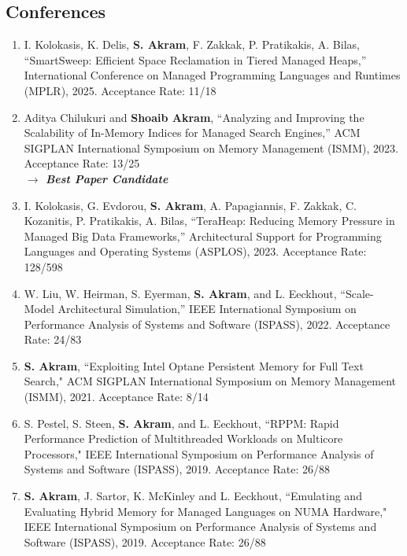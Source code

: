 \documentclass[singlecolumn,singlespace,11pt]{article}
\begin{document}
\subsection*{Conferences}
\begin{enumerate}

\item 
I. Kolokasis, K. Delis, \textbf{S. Akram}, F. Zakkak, P. Pratikakis, A. Bilas, ``SmartSweep: Efficient Space Reclamation in Tiered Managed Heaps,'' International Conference on Managed Programming Languages and Runtimes (MPLR), 2025. {\color{blue} Acceptance Rate: 11/18}


\item
Aditya Chilukuri and \textbf{Shoaib Akram}, ``Analyzing and Improving the Scalability of In-Memory Indices for Managed Search Engines,'' ACM SIGPLAN International Symposium on Memory Management (ISMM), 2023. {\color{blue} Acceptance Rate: 13/25}
\\
{\color{BrickRed} \textbf{$\longrightarrow$ \emph{Best Paper Candidate}}}

\item 
I. Kolokasis, G. Evdorou, \textbf{S. Akram}, A. Papagiannis, F. Zakkak, C. Kozanitis, P. Pratikakis, A. Bilas, ``TeraHeap: Reducing Memory Pressure in Managed Big Data Frameworks,'' Architectural Support for Programming Languages and Operating Systems (ASPLOS), 2023. {\color{blue} Acceptance Rate: 128/598}

\item
W. Liu, W. Heirman, S. Eyerman, \textbf{S. Akram}, and L. Eeckhout,
``Scale-Model Architectural Simulation,'' IEEE International Symposium on
Performance Analysis of Systems and Software (ISPASS), 2022. {\color{blue} Acceptance Rate: 24/83}

\item
\textbf{S. Akram}, ``Exploiting Intel Optane Persistent Memory for Full Text Search," ACM SIGPLAN International Symposium on Memory Management (ISMM), 2021. {\color{blue} Acceptance Rate: 8/14}

\item
S. Pestel, S. Steen, \textbf{S. Akram}, and L. Eeckhout, ``RPPM: Rapid Performance Prediction of Multithreaded Workloads on Multicore Processors," IEEE International Symposium on Performance Analysis of Systems and Software (ISPASS), 2019. {\color{blue} Acceptance Rate: 26/88}

\item
\textbf{S. Akram}, J. Sartor, K. McKinley and L. Eeckhout, ``Emulating and Evaluating Hybrid Memory for Managed Languages on NUMA Hardware," IEEE International Symposium on Performance Analysis of Systems and Software (ISPASS), 2019. {\color{blue} Acceptance Rate: 26/88}


\end{enumerate}
\end{document}
